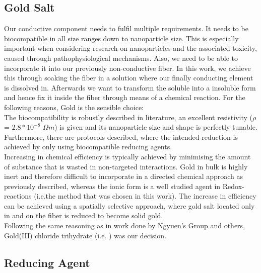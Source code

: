 \subsection{Gold Salt}
Our conductive component needs to fulfil multiple requirements. It needs to be biocompatible in all size ranges down to nanoparticle size. This is especially important when considering research on nanoparticles and the associated toxicity, caused through pathophysiological mechanisms.\cite{Buzea, Shukla} Also, we need to be able to incorporate it into our previously non-conductive fiber. In this work, we achieve this through soaking the fiber in a solution where our finally conducting element is dissolved in. Afterwards we want to transform the soluble into a insoluble form and hence fix it inside the fiber through means of a chemical reaction. For the following reasons, Gold is the sensible choice:\\
The biocompatibility is robustly described in literature\cite{Connor, Shukla}, an excellent resistivity ($\rho$ = $2.8*10^{-8}$ $\Omega m$\cite{Principles}) is given and its nanoparticle size and shape is perfectly tunable\cite{Kimling}. Furthermore, there are protocols described, where the intended reduction is achieved by only using biocompatible reducing agents.\cite{Turkevich}\\
Increasing in chemical efficiency is typically achieved by minimising the amount of substance that is wasted in non-targeted interactions. Gold in bulk is highly inert and therefore difficult to incorporate in a directed chemical approach as previously described, whereas the ionic form is a well studied agent in Redox-reactions (i.e.the method that was chosen in this work). The increase in efficiency can be achieved using a spatially selective approach, where gold salt located only in and on the fiber is reduced to become solid gold.\\
Following the same reasoning as in work done by Ngyuen's Group\cite{Nguyen} and others\cite{El-Say, Satis}, Gold(III) chloride trihydrate (i.e. ) was our decision. 


\subsection{Reducing Agent}
\label{subsec:RedAgent}

